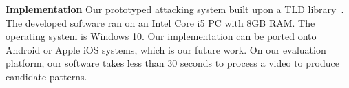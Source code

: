    \noindent\textbf{Implementation} Our prototyped attacking system built upon a TLD library~\cite{TLD-toolbox-web}.
    The developed software ran on an Intel Core i5 PC with
    8GB RAM. The operating system is Windows 10. Our implementation can be ported onto
    Android or Apple iOS systems, which is our future work. On our evaluation
    platform, our software takes less than 30 seconds to process a video to produce candidate patterns.
